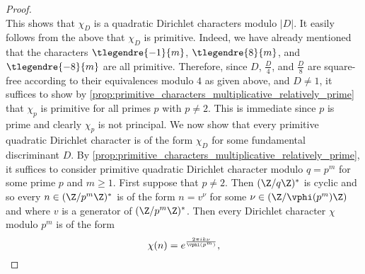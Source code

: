\begin{proof}
\[      \]
      This shows that $\chi_{D}$ is a quadratic Dirichlet characters modulo $|D|$. It easily follows from the above that $\chi_{D}$ is primitive. Indeed, we have already mentioned that the characters $\tlegendre{-1}{m}$, $\tlegendre{8}{m}$, and $\tlegendre{-8}{m}$ are all primitive. Therefore, since $D$, $\frac{D}{4}$, and $\frac{D}{8}$ are square-free according to their equivalences modulo $4$ as given above, and $D \neq 1$, it suffices to show by \cref{prop:primitive_characters_multiplicative_relatively_prime} that $\chi_{p}$ is primitive for all primes $p$ with $p \neq 2$. This is immediate since $p$ is prime and clearly $\chi_{p}$ is not principal. We now show that every primitive quadratic Dirichlet character is of the form $\chi_{D}$ for some fundamental discriminant $D$. By \cref{prop:primitive_characters_multiplicative_relatively_prime}, it suffices to consider primitive quadratic Dirichlet character modulo $q = p^{m}$ for some prime $p$ and $m \ge 1$. First suppose that $p \neq 2$. Then $(\Z/q\Z)^{\ast}$ is cyclic and so every $n \in (\Z/p^{m}\Z)^{\ast}$ is of the form $n = v^{\nu}$ for some $\nu \in (\Z/\vphi(p^{m})\Z)$ and where $v$ is a generator of $(\Z/p^{m}\Z)^{\ast}$. Then every Dirichlet character $\chi$ modulo $p^{m}$ is of the form
      \[
        \chi(n) = e^{\frac{2\pi ik\nu}{\vphi(p^{m})}},
      \]

\end{proof}
